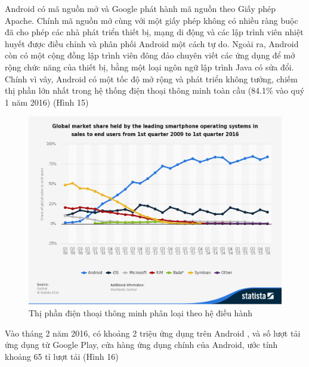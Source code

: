 \documentclass[a4paper]{article}
\begin{document}
Android có mã nguồn mở và Google phát hành mã nguồn theo Giấy phép Apache. Chính mã nguồn mở cùng với một giấy phép không có nhiều ràng buộc đã cho phép các nhà phát triển thiết bị, mạng di động và các lập trình viên nhiệt huyết được điều chỉnh và phân phối Android một cách tự do. Ngoài ra, Android còn có một cộng đồng lập trình viên đông đảo chuyên viết các ứng dụng để mở rộng chức năng của thiết bị, bằng một loại ngôn ngữ lập trình Java có sửa đổi. Chính vì vây, Android có một tốc độ mở rộng và phát triển không tưởng, chiếm thị phần lớn nhất trong hệ thống điện thoại thông minh toàn cầu (84.1\% vào quý 1 năm 2016) \cite{bib6} (Hình 15)
\begin{center}
    \begin{figure}[h]
    \begin{center}
     \includegraphics[scale=.3]{android_shipment_market.png}
    \end{center}
    \caption{Thị phần điện thoại thông minh phân loại theo hệ điều hành}
    \label{refhinh1}
    \end{figure}
\end{center}
Vào tháng 2 năm 2016, có khoảng 2 triệu ứng dụng trên Android \cite{bib7}, và số lượt tải ứng dụng từ Google Play, cửa hàng ứng dụng chính của Android, ước tính khoảng 65 tỉ lượt tải \cite{bib8} (Hình 16)
\end{document}
